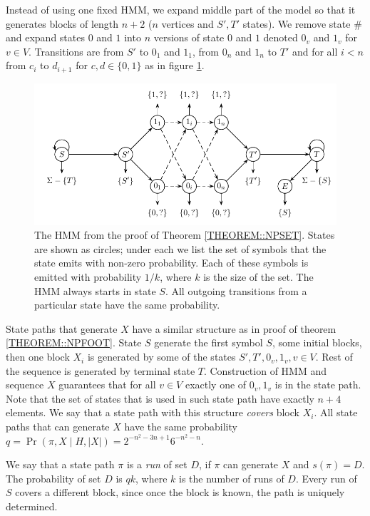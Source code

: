 Instead of using one fixed HMM, we expand middle part of the model so that it
generates blocks of length $n+2$ ($n$ vertices and $S', T'$ states). We remove
state $\#$ and expand states $0$ and $1$ into $n$ versions of state $0$ and $1$
denoted $0_v$ and $1_v$ for $v \in V$.  Transitions are from $S'$ to $0_1$ and
$1_1$, from $0_n$ and $1_n$ to $T'$ and for all $i<n$ from $c_i$ to $d_{i+1}$
for $c,d\in \{0, 1\}$ as in figure  \ref{fig:set_hmm2}. 

\begin{figure}[t]
\centerline{\includegraphics[scale=0.68]{../figures/jcss/expandedcliquehmm.pdf}}
\caption{\label{fig:set_hmm2} The HMM from the proof of Theorem
  \ref{THEOREM::NPSET}. States are shown as circles; under each we
  list the set of symbols that the state emits with non-zero
  probability. Each of these symbols is emitted with probability
  $1/k$, where $k$ is the size of the set. The HMM always starts in
  state $S$. All outgoing transitions from a particular state have
  the same probability.}
\end{figure}

State paths that generate $X$ have a similar structure as in proof of theorem
\ref{THEOREM::NPFOOT}. State $S$ generate the first symbol $S$, some initial blocks,
then one block $X_i$ is generated by some of the states $S', T', 0_v, 1_v, v\in
V$.  Rest of the sequence is generated by terminal state $T$.  Construction of
HMM and sequence $X$ guarantees that for all $v\in V$ exactly one of $0_v, 1_v$
is in the state path. Note that the set of states that is used in such state
path have exactly $n+4$ elements. We say that a state path with this structure
\emph{covers} block $X_i$. All state paths that can generate $X$ have the same
probability $q = \Pr(\pi, X\mid H, |X|) = 2^{-n^2-3n+1}6^{-n^2 - n}$.

We say that a state path $\pi$ is a \emph{run} of set $D$, if $\pi$ can generate
$X$ and $s(\pi) = D$. The probability of set $D$ is $qk$, where $k$ is the
number of runs of $D$. Every run of $S$ covers a different block, since once the
block is known, the path is uniquely determined.

